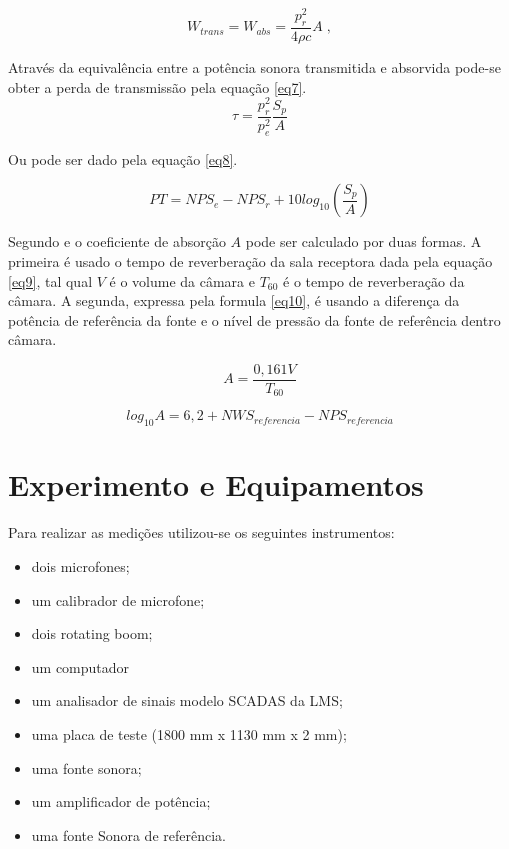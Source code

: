 \begin{equation}
	W_{trans} = W_{abs}=\frac{p_{r}^{2}}{4\rho c}A\;,
	\label{eq6}
\end{equation}

Através da equivalência entre a potência sonora transmitida e absorvida pode-se obter a perda de transmissão pela equação \ref{eq7}.
\begin{equation}
	\tau = \frac{p_{r}^{2}}{p_{e}^{2}}\frac{S_{p}}{A}
	\label{eq7}
\end{equation}

Ou pode ser dado pela equação \ref{eq8}.

\begin{equation}
	PT = NPS_{e} - NPS_{r} + 10log_{10}\left(\frac{S_{p}}{A}\right)
	\label{eq8}
\end{equation}

Segundo \cite{silva2009simulaccao} e \cite{lenzi2009modelos} o coeficiente de absorção $A$ pode ser calculado por duas formas. A primeira é usado o tempo de reverberação da sala receptora dada pela equação \ref{eq9}, tal qual $V$ é o volume da câmara e $T_{60}$ é o tempo de reverberação da câmara. A segunda, expressa pela formula \ref{eq10}, é usando a diferença da potência de referência da fonte e o nível de pressão da fonte de referência dentro câmara.

\begin{equation}
	A = \frac{0,161V}{T_{60}}
	\label{eq9}
\end{equation}

\begin{equation}
	log_{10}A = 6,2 + NWS_{referencia} - NPS_{referencia}	
	\label{eq10}
\end{equation}

\chapter{Experimento e Equipamentos}\label{descricao}

Para realizar as medições utilizou-se os seguintes instrumentos:

\begin{itemize}
	\item dois microfones;
	\item um calibrador de microfone;
	\item dois rotating boom;
	\item um computador
	\item um analisador de sinais modelo SCADAS da LMS;
	\item uma placa de teste (1800 mm x 1130 mm x 2 mm);
	\item uma fonte sonora;
	\item um amplificador de potência;
	\item uma fonte Sonora de referência.
\end{itemize}

